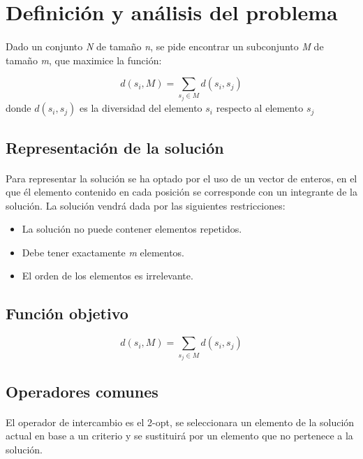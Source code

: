 \documentclass{article}
\begin{document}
	\section{Definición y análisis del problema}
	
	\paragraph{}Dado un conjunto \emph{N} de tamaño \emph{n}, se pide encontrar un subconjunto \emph{M} de tamaño \emph{m}, que maximice
	la función: 
	
	\[ d(s_i,M)=\sum_{s_j \in M} d(s_i,s_j)\]
	donde  $d(s_i,s_j)$ es la diversidad del elemento $s_i$ respecto al elemento $s_j$
	
	\subsection{Representación de la solución}
	
	\paragraph{} Para representar la solución se ha optado por el uso de un vector de enteros, en el que él elemento contenido en cada posición se corresponde con un integrante de la solución. La solución vendrá dada por las siguientes restricciones:
		\begin{itemize}
			
			\item La solución no puede contener elementos repetidos.
			
			\item Debe tener exactamente \emph{m} elementos.
			
			\item El orden de los elementos es irrelevante.
			
		\end{itemize}
	
	
	\subsection{Función objetivo}
	
	\[ d(s_i,M)=\sum_{s_j \in M} d(s_i,s_j)\]
	
	\subsection{Operadores comunes}
	
	\paragraph{}El operador de intercambio es el 2-opt, se seleccionara un elemento de la solución actual en base a un criterio y se sustituirá por un elemento que no pertenece a la solución. 
	
\end{document}
